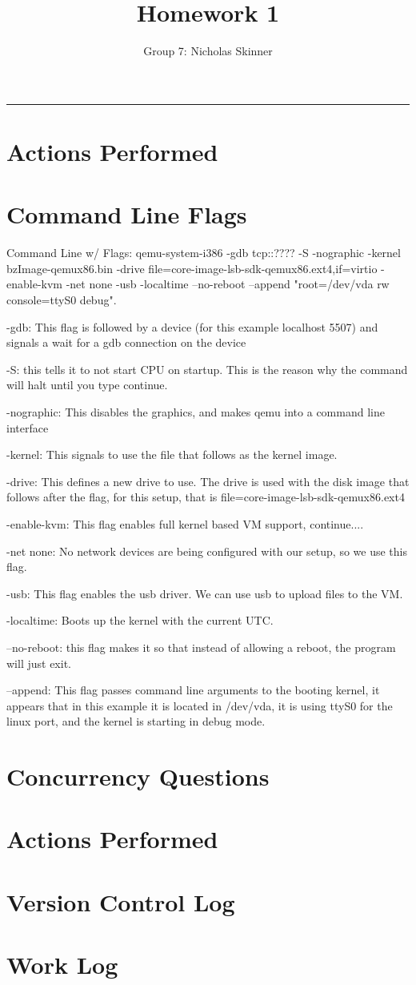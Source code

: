 \documentclass[letterpaper,10pt,fleqn]{article}
\title{Homework 1}
\author{Group 7: Nicholas Skinner}
\begin{document}
	\maketitle
	\hrule
	
	\section*{Actions Performed}

	\section*{Command Line Flags}
	Command Line w/ Flags:
	qemu-system-i386 -gdb tcp::???? -S -nographic -kernel bzImage-qemux86.bin -drive file=core-image-lsb-sdk-qemux86.ext4,if=virtio -enable-kvm -net none -usb -localtime --no-reboot --append "root=/dev/vda rw console=ttyS0 debug".
	
	-gdb: This flag is followed by a device (for this example localhost 5507) and signals a wait for a gdb connection on the device
	
	-S: this tells it to not start CPU on startup. This is the reason why the command will halt until you type continue.
	
	-nographic: This disables the graphics, and makes qemu into a command line interface
	
	-kernel: This signals to use the file that follows as the kernel image. 
	
	-drive: This defines a new drive to use. The drive is used with the disk image that follows after the flag, for this setup, that is file=core-image-lsb-sdk-qemux86.ext4
	
	-enable-kvm: This flag enables full kernel based VM support, continue....
	
	-net none: No network devices are being configured with our setup, so we use this flag.
	
	-usb: This flag enables the usb driver. We can use usb to upload files to the VM. 
	
	-localtime: Boots up the kernel with the current UTC.
	
	--no-reboot: this flag makes it so that instead of allowing a reboot, the program will just exit.
	
	--append: This flag passes command line arguments to the booting kernel, it appears that in this example it is located in /dev/vda, it is using ttyS0 for the linux port, and the kernel is starting in debug mode.
	
	\section*{Concurrency Questions}
	
	\section*{Actions Performed}
	
	\section*{Version Control Log}
	
	\section*{Work Log}
\end{document}
